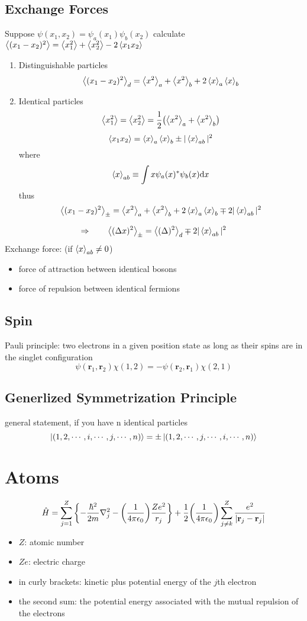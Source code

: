 \subsection{Exchange Forces}
Suppose \(\psi(x_1,x_2)=\psi_a(x_1)\psi_b(x_2)\)\newline
calculate \(\expval{(x_1-x_2)^2} = \expval{x_1^2}+\expval{x_2^2}-2\expval{x_1x_2}\)
\begin{enumerate}
	\item Distinguishable particles \newline
         \[ \expval{(x_1-x_2)^2}_d = \expval{x^2}_a+ \expval{x^2}_b+  2\expval{x}_a \expval{x}_b\]
 \item Identical particles
        \[\expval{x_1^2}=\expval{x_2^2}=\frac{1}{2}\qty(\expval{x^2}_a+\expval{x^2}_b)\]
		\[\expval{x_1x_2} = \expval{x}_a\expval{x}_b\pm |\expval{x}_{ab}|^2\]
		 where \[\expval{x}_{ab}\equiv\int x\psi_a(x)^*\psi_b(x)\dd x\]
		 thus \[\expval{(x_1-x_2)^2}_{\pm} = \expval{x^2}_a+\expval{x^2}_b +2\expval{x}_a\expval{x}_b \mp 2|\expval{x}_{ab}|^2\]
\end{enumerate}
\[\Rightarrow\qquad\expval{(\Delta x )^2}_\pm =\expval{(\Delta )^2}_d\mp 2|\expval{x}_{ab}|^2 \]
Exchange force: (if \(\expval{x}_{ab}\neq 0\))
\begin{itemize}
	\item force of attraction between identical bosons
 \item force of repulsion between identical fermions
\end{itemize}
\subsection{Spin}
Pauli principle: two electrons in a given position state as long as their spins are in the singlet configuration
\[\psi(\mathbf{r}_1,\mathbf{r}_2)\chi(1,2)=-\psi(\mathbf{r}_2,\mathbf{r}_1)\chi(2,1)\]

\subsection{Generlized Symmetrization Principle}
general statement, if you have n identical particles
\[\ket{(1,2,\cdots,i,\cdots,j,\cdots,n)} = \pm \ket{(1,2,\cdots,j,\cdots,i,\cdots,n)}\]
\section{Atoms}
\[\hat{H}=\sum_{j=1}^Z\qty{ - \frac{\hbar^2}{2m}\nabla^2_j - 
                \qty(\frac{1}{4\pi\epsilon_0})\frac{Ze^2}{r_j}} 
				   + \frac{1}{2}\qty(\frac{1}{4\pi\epsilon_0})\sum_{j\neq k}^Z\frac{e^2}{|\mathbf{r}_j - \mathbf{r}_j|}\]
\begin{itemize}
	\item \(Z\): atomic number
 \item \(Ze\): electric charge
 \item in curly brackets: kinetic plus potential energy of the \(j\)th electron
 \item the second sum: the potential energy associated with the mutual repulsion of the electrons
\end{itemize}
